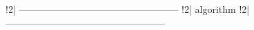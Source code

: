 !2| --------------------------------------------------
!2| {algorithm}
!2| --------------------------------------------------

\usepackage{algorithm}
